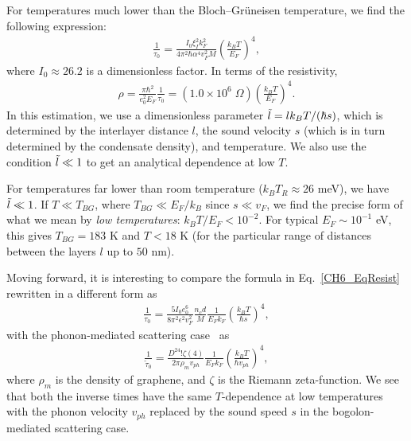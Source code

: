 For temperatures much lower than the Bloch--Gr\"{u}neisen temperature, we find the following expression:
%
\begin{eqnarray}\label{CH6_f_tau}
\frac{1}{\tau_0}=\frac{I_0\xi_I^2k_F^2}{4\pi^2\hbar \alpha^4v_F^2M}\left(\frac{k_BT}{E_F}\right)^4,
\end{eqnarray}
%
where $I_0\approx 26.2$ is a dimensionless factor.
In terms of the resistivity,
%
\begin{eqnarray}
\label{CH6_EqResist}
\rho=\frac{\pi\hbar^2}{e_0^2E_F}\frac{1}{\tau_0}=(1.0\times 10^6\;\Omega)\left(\frac{k_BT}{E_F}\right)^4.
\end{eqnarray}
%
In this estimation, we use a dimensionless parameter $\Tilde{l}=lk_BT/(\hbar s)$, which is determined by the interlayer distance $l$, the sound velocity $s$ (which is in turn determined by the condensate density), and temperature. We also use the condition $\Tilde{l}\ll 1$ to get an analytical dependence at low $T$.

For temperatures far lower than room temperature ($k_BT_R\approx 26$ meV), we have $\Tilde{l}\ll 1$.
If $T\ll T_{BG}$, where $T_{BG}\ll E_F/k_B$ since $s\ll v_F$, we find the precise form of what we mean by \textit{low temperatures}: $k_BT/E_F<10^{-2}$.
For typical $E_F\sim 10^{-1}$ eV, this gives $T_{BG}=183$ K and  $T<18$ K (for the particular range of distances between the layers $l$ up to $50$ nm).

Moving forward, it is interesting to compare the formula in Eq.~\eqref{CH6_EqResist} rewritten in a different form as
%
\begin{eqnarray}\label{CH6_f_tau_app}
\frac{1}{\tau_0}=\frac{5I_0e_0^6}{8\pi^2\epsilon^2v_F^2}\frac{n_cd}{M}\frac{1}{E_Fk_F}\left(\frac{k_BT}{\hbar s}\right)^4,
\end{eqnarray}
%
with the phonon-mediated scattering case~\cite{Hwang:2008aa} as
%
\begin{eqnarray}
\label{CH6_phonon}
\frac{1}{\tilde{\tau}_0}=\frac{D^24!\zeta(4)}{2\pi\rho_mv_{ph}}\frac{1}{E_Fk_F}\left(\frac{k_BT}{\hbar v_{ph}}\right)^4,
\end{eqnarray}
%
where $\rho_m$ is the density of graphene, and $\zeta$ is the Riemann zeta-function. We see that both the inverse times have the same $T$-dependence at low temperatures with the phonon velocity $v_{ph}$ replaced by the sound speed $s$ in the bogolon-mediated scattering case.

